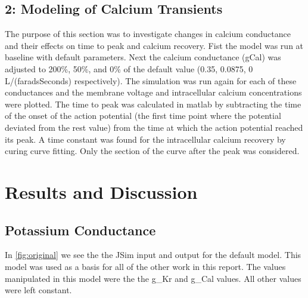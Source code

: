 \documentclass[11pt]{article}
\begin{document}
\subsection{2: Modeling of Calcium Transients}
\par{}
The purpose of this section was to investigate changes in calcium conductance and their effects on time to peak and calcium recovery. Fist the model was run at baseline with default parameters. Next the calcium conductance (gCal) was adjusted to 200\%, 50\%, and 0\% of the default value (0.35, 0.0875, 0
L/(faradsSeconds) respectively). The simulation was run again for each of these conductances and the membrane voltage and intracellular calcium concentrations were plotted. The time to peak was calculated in matlab by subtracting the time of the onset of the action potential (the first time point where the potential deviated from the rest value) from the time at which the action potential reached its peak. A time constant was found for the intracellular calcium recovery by curing curve fitting. Only the section of the curve after the peak was considered.

\section{Results and Discussion}
\subsection{Potassium Conductance}
\par{}
In \ref{fig:original} we see the the JSim input and output for the default model. This model was used as a basis for all of the other work in this report. The values manipulated in this model were the the g\_Kr and g\_Cal values. All other values were left constant.
\end{document}
